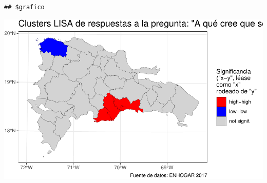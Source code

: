\documentclass[11pt,]{article}
\begin{document}
\begin{verbatim}
## $grafico
\end{verbatim}

\includegraphics{proyecto_files/figure-latex/unnamed-chunk-25-2.pdf}
\end{document}
